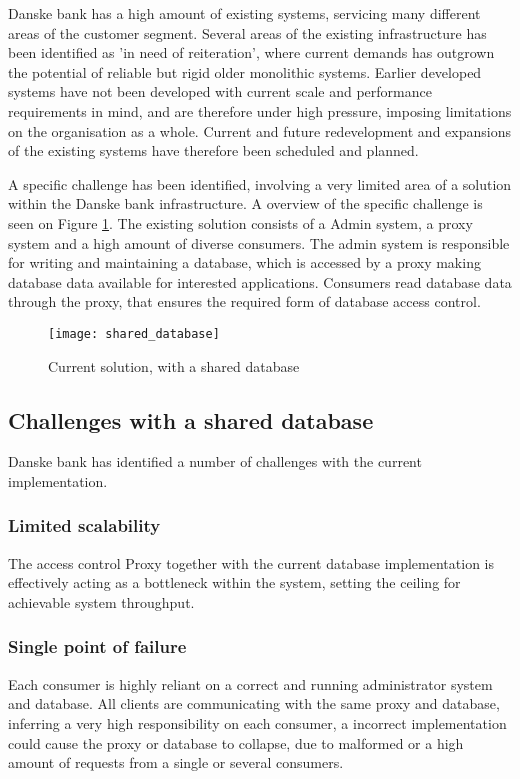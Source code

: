 Danske bank has a high amount of existing systems, servicing many different areas of the customer segment. Several areas of the existing infrastructure has been identified as 'in need of reiteration', where current demands has outgrown the potential of reliable but rigid older monolithic systems. Earlier developed systems have not been developed with current scale and performance requirements in mind, and are therefore under high pressure, imposing limitations on the organisation as a whole. Current and future redevelopment and expansions of the existing systems have therefore been scheduled and planned. 


A specific challenge has been identified, involving a very limited area of a solution within the Danske bank infrastructure. A overview of the specific challenge is seen on Figure \ref{fig:shared_database}. The existing solution consists of a Admin system, a proxy system and a high amount of diverse consumers. The admin system is responsible for writing and maintaining a database, which is accessed by a proxy making database data available for interested applications. Consumers read database data through the proxy, that ensures the required form of database access control.

\begin{figure}[!htb]
  \texttt{[image: shared\_database]}  
  \caption{Current solution, with a shared database}
  \label{fig:shared_database}
\end{figure}

\subsection{Challenges with a shared database}
Danske bank has identified a number of challenges with the current implementation. 

\subsubsection{Limited scalability}
The access control Proxy together with the current database implementation is effectively acting as a bottleneck within the system, setting the ceiling for achievable system throughput.

\subsubsection{Single point of failure}
Each consumer is highly reliant on a correct and running administrator system and database. All clients are communicating with the same proxy and database, inferring a very high responsibility on each consumer, a incorrect implementation could cause the proxy or database to collapse, due to malformed or a high amount of requests from a single or several consumers.


